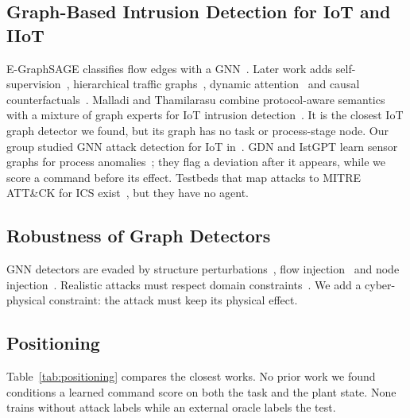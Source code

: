 \documentclass[journal]{IEEEtran}
\begin{document}
\subsection{Graph-Based Intrusion Detection for IoT and IIoT}
E-GraphSAGE classifies flow edges with a GNN~\cite{lo2022egraphsage}. Later work adds self-supervision~\cite{caville2022anomale}, hierarchical traffic graphs~\cite{kong2025grid}, dynamic attention~\cite{sun2025hadga} and causal counterfactuals~\cite{zhang2026ccgids}. Malladi and Thamilarasu combine protocol-aware semantics with a mixture of graph experts for IoT intrusion detection~\cite{malladi2026protocol}. It is the closest IoT graph detector we found, but its graph has no task or process-stage node. Our group studied GNN attack detection for IoT in~\cite{rezki2025leveraging}. GDN and IstGPT learn sensor graphs for process anomalies~\cite{deng2021gdn,zhang2026istgpt}; they flag a deviation after it appears, while we score a command before its effect. Testbeds that map attacks to MITRE ATT\&CK for ICS exist~\cite{rahmani2026mitre}, but they have no agent.

\subsection{Robustness of Graph Detectors}
GNN detectors are evaded by structure perturbations~\cite{zugner2020adversarial}, flow injection~\cite{mouzaoui2026flow} and node injection~\cite{liang2026segia}. Realistic attacks must respect domain constraints~\cite{sheatsley2022adversarial,catillo2024problemspace}. We add a cyber-physical constraint: the attack must keep its physical effect.

\subsection{Positioning}
Table~\ref{tab:positioning} compares the closest works. No prior work we found conditions a learned command score on both the task and the plant state. None trains without attack labels while an external oracle labels the test.
\end{document}
